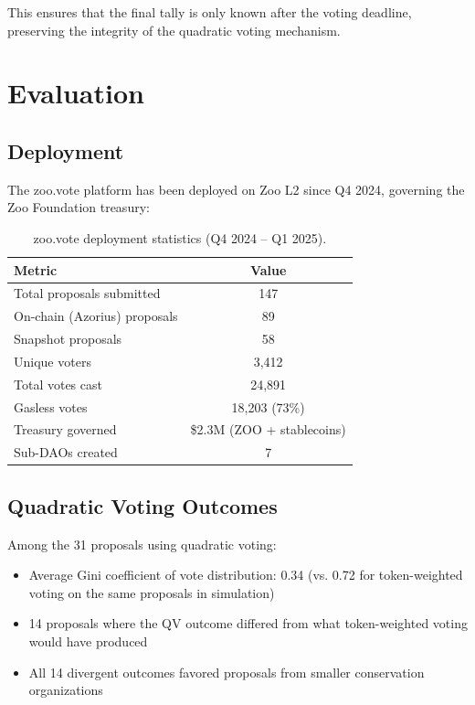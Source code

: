 \documentclass[11pt,letterpaper]{article}
\begin{document}
This ensures that the final tally is only known after the voting deadline, preserving the integrity of the quadratic voting mechanism.

\section{Evaluation}
\label{sec:evaluation}

\subsection{Deployment}

The zoo.vote platform has been deployed on Zoo L2 since Q4 2024, governing the Zoo Foundation treasury:

\begin{table}[t]
\centering
\begin{tabular}{lc}
\toprule
\textbf{Metric} & \textbf{Value} \\
\midrule
Total proposals submitted & 147 \\
On-chain (Azorius) proposals & 89 \\
Snapshot proposals & 58 \\
Unique voters & 3,412 \\
Total votes cast & 24,891 \\
Gasless votes & 18,203 (73\%) \\
Treasury governed & \$2.3M (ZOO + stablecoins) \\
Sub-DAOs created & 7 \\
\bottomrule
\end{tabular}
\caption{zoo.vote deployment statistics (Q4 2024 -- Q1 2025).}
\label{tab:deployment}
\end{table}

\subsection{Quadratic Voting Outcomes}

Among the 31 proposals using quadratic voting:

\begin{itemize}
    \item Average Gini coefficient of vote distribution: 0.34 (vs. 0.72 for token-weighted voting on the same proposals in simulation)
    \item 14 proposals where the QV outcome differed from what token-weighted voting would have produced
    \item All 14 divergent outcomes favored proposals from smaller conservation organizations
\end{itemize}
\end{document}
